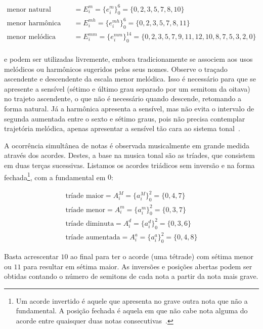 \begin{equation}
\begin{split}
\text{menor natural (igual acima)} & = E_i^m = \{e_i^m\}_0^6 = \{0,2,3,5,7,8,10\} \\
\text{menor harmônica} & = E_i^{mh} = \{e_i^{mh}\}_0^6 = \{0,2,3,5,7,8,11\} \\
\text{menor melódica} & = E_i^{mm} = \{e_i^{mm}\}_0^{14} = \{0,2,3,5,7,9,11,12,10,8,7,5,3,2,0\} \\
\end{split}
\end{equation}

e podem ser utilizadas livremente, embora tradicionamente se associem aos usos melódicos ou harmônicos sugeridos pelos seus nomes. Observe o traçado ascendente e descendente da escala menor melódica. Isso é necessário para que se apresente a sensível (sétimo e último grau separado por um semitom da oitava) no trajeto ascendente, o que não é necessário quando descende, retomando a forma natural. Já a harmônica apresenta a sensível, mas não evita o intervalo de segunda aumentada entre o sexto e sétimo graus, pois não precisa contemplar trajetória melódica, apenas apresentar a sensível tão cara ao sistema tonal~\cite{Harmonia}.

A ocorrência simultânea de notas é observada musicalmente em grande medida
através dos acordes. Destes, a base na musica tonal são as tríades, que consistem em duas terças sucessivas. Listamos os acordes triádicos sem inversão e na forma fechada\footnote{Um acorde invertido é aquele que apresenta no grave outra nota que não a fundamental. A posição fechada é aquela em que não cabe nota alguma do acorde entre quaisquer duas notas consecutivas~\cite{Lacerda}.},
com a fundamental em $0$:

\begin{equation}\label{triades}
\begin{split}
\text{tríade maior} = A_i^M= \{a_i^M\}_0^2=\{0,4,7\} \\ 
\text{tríade menor} = A_i^m = \{a_i^m\}_0^2=\{0,3,7\} \\
\text{tríade diminuta} = A_i^d = \{a_i^d\}_0^2=\{0,3,6\} \\
\text{tríade aumentada} = A_i^a = \{a_i^a\}_0^2=\{0,4,8\}
\end{split}
\end{equation}

Basta acrescentar $10$ ao final para ter o acorde (uma tétrade)
com sétima menor ou $11$ para resultar em sétima maior. As inversões e posições abertas
podem ser obtidas contando o número de semitons de cada nota a partir da nota mais grave.

